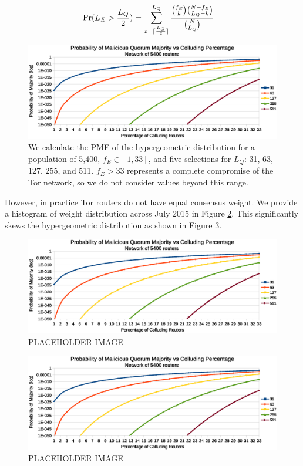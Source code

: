 \documentclass[conference]{IEEEtran}
\DeclarePairedDelimiter{\ceil}{\lceil}{\rceil}
\begin{document}
\begin{align}
	\mathrm{Pr}(L_{E} > \frac{L_{Q}}{2}) &= \displaystyle\sum_{x=\ceil{\frac{L_{Q}}{2}}}^{L_{Q}} \frac{\binom{f_{E}}{k}\binom{N - f_{E}}{L_{Q} - k}}{\binom{N}{L_{Q}}}
	\label{eq:compromiseProb}
\end{align}

\begin{figure}
	\centering
	\includegraphics[width=0.75\linewidth]{../assets/analysis/MaliciousQuorumProbability_tight.eps}
	\caption{We calculate the PMF of the hypergeometric distribution for a population of 5,400, $ f_{E} \in [1,33] $, and five selections for $ L_{Q} $: 31, 63, 127, 255, and 511. $ f_{E} > 33 $ represents a complete compromise of the Tor network, so we do not consider values beyond this range.}
	\label{fig:quorumMajority}
\end{figure}

However, in practice Tor routers do not have equal consensus weight. We provide a histogram of weight distribution across July 2015 in Figure \ref{fig:weightDist}. This significantly skews the hypergeometric distribution as shown in Figure \ref{fig:skewedProb}.

\begin{figure}[htbp]
	\centering
	\includegraphics[width=0.95\linewidth]{../assets/analysis/MaliciousQuorumProbability_tight.eps}
	\caption{PLACEHOLDER IMAGE}
	\label{fig:weightDist}
\end{figure}

\begin{figure}[htbp]
	\centering
	\includegraphics[width=0.95\linewidth]{../assets/analysis/MaliciousQuorumProbability_tight.eps}
	\caption{PLACEHOLDER IMAGE}
	\label{fig:skewedProb}
\end{figure}
\end{document}
